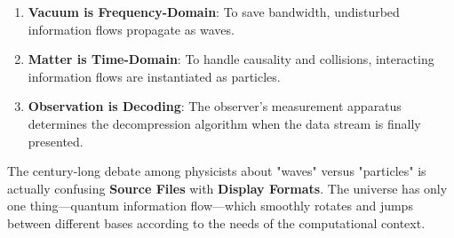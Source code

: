 \begin{enumerate}
\item \textbf{Vacuum is Frequency-Domain}: To save bandwidth, undisturbed information flows propagate as waves.

\item \textbf{Matter is Time-Domain}: To handle causality and collisions, interacting information flows are instantiated as particles.

\item \textbf{Observation is Decoding}: The observer's measurement apparatus determines the decompression algorithm when the data stream is finally presented.
\end{enumerate}

The century-long debate among physicists about "waves" versus "particles" is actually confusing \textbf{Source Files} with \textbf{Display Formats}. The universe has only one thing—quantum information flow—which smoothly rotates and jumps between different bases according to the needs of the computational context.

